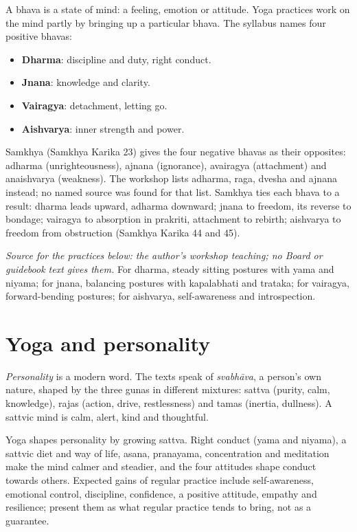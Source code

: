 A bhava is a state of mind: a feeling, emotion or attitude. Yoga practices work on the mind partly by bringing up a particular bhava. The syllabus names four positive bhavas:
\begin{itemize}
\item \textbf{Dharma}: discipline and duty, right conduct.
\item \textbf{Jnana}: knowledge and clarity.
\item \textbf{Vairagya}: detachment, letting go.
\item \textbf{Aishvarya}: inner strength and power.
\end{itemize}
Samkhya (Samkhya Karika 23) gives the four negative bhavas as their opposites: adharma (unrighteousness), ajnana (ignorance), avairagya (attachment) and anaishvarya (weakness). The workshop lists adharma, raga, dvesha and ajnana instead; no named source was found for that list. Samkhya ties each bhava to a result: dharma leads upward, adharma downward; jnana to freedom, its reverse to bondage; vairagya to absorption in prakriti, attachment to rebirth; aishvarya to freedom from obstruction (Samkhya Karika 44 and 45).

\textit{Source for the practices below: the author's workshop teaching; no Board or guidebook text gives them.} For dharma, steady sitting postures with yama and niyama; for jnana, balancing postures with kapalabhati and trataka; for vairagya, forward-bending postures; for aishvarya, self-awareness and introspection.

\section{Yoga and personality}

\emph{Personality} is a modern word. The texts speak of \emph{svabhāva}, a person's own nature, shaped by the three gunas in different mixtures: sattva (purity, calm, knowledge), rajas (action, drive, restlessness) and tamas (inertia, dullness). A sattvic mind is calm, alert, kind and thoughtful.

Yoga shapes personality by growing sattva. Right conduct (yama and niyama), a sattvic diet and way of life, asana, pranayama, concentration and meditation make the mind calmer and steadier, and the four attitudes shape conduct towards others. Expected gains of regular practice include self-awareness, emotional control, discipline, confidence, a positive attitude, empathy and resilience; present them as what regular practice tends to bring, not as a guarantee.

